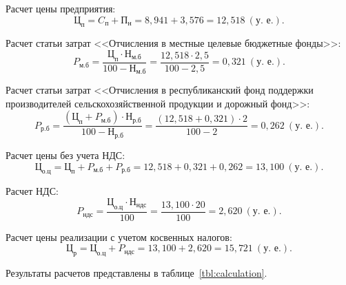 Расчет цены предприятия:
\begin{equation*}
\text{Ц}_{\text{п}} = 
C_{\text{п}} + \text{П}_{\text{н}} =
8{,}941 + 3{,}576 =
12{,}518 \: (\text{у.~е.}).
\end{equation*}



Расчет статьи затрат 
<<Отчисления в местные целевые бюджетные фонды>>:
\begin{equation*}
P_{\text{м.б}} = 
\dfrac{
  \text{Ц}_{\text{п}} \cdot \text{Н}_{\text{м.б}}
}{
  100 - \text{Н}_{\text{м.б}}
} =
\dfrac{12{,}518 \cdot 2{,}5 }{100 - 2{,}5}  =
0{,}321 \: (\text{у.~е.}).
\end{equation*}

Расчет статьи затрат 
<<Отчисления в республиканский фонд поддержки производителей
сельскохозяйственной продукции и дорожный фонд>>:
\begin{equation*}
P_{\text{р.б}} = 
\dfrac{
  (\text{Ц}_{\text{п}} + P_{\text{м.б}}) \cdot \text{Н}_{\text{р.б}}
}{
  100 - \text{Н}_{\text{р.б}}
} =
\dfrac{(12{,}518 + 0{,}321) \cdot 2}{100 - 2} =
0{,}262 \: (\text{у.~е.}).
\end{equation*}

Расчет цены без учета НДС:
\begin{equation*}
\text{Ц}_{\text{о.ц}} = 
\text{Ц}_{\text{п}} + P_{\text{м.б}} + P_{\text{р.б}} = 
12{,}518 + 0{,}321 + 0{,}262 =
13{,}100 \: (\text{у.~е.}).
\end{equation*}

Расчет НДС:
\begin{equation*}
P_{\text{ндс}} = 
\dfrac{
  \text{Ц}_{\text{о.ц}} \cdot \text{Н}_{\text{ндс}}
}{
  100
} =
\dfrac{13{,}100 \cdot 20}{100}  =
2{,}620 \: (\text{у.~е.}).
\end{equation*}

Расчет цены реализации с учетом косвенных налогов:
\begin{equation*}
\text{Ц}_{\text{р}} = 
\text{Ц}_{\text{о.ц}} + P_{\text{ндс}} =
13{,}100 + 2{,}620 = 
15{,}721 \: (\text{у.~е.}).
\end{equation*}

Результаты расчетов представлены в таблице~\ref{tbl:calculation}.

